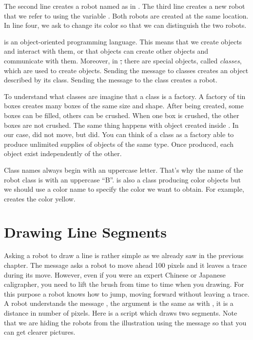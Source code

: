 The second line creates a robot named \caro as in . The third line creates a new robot that we refer to using the variable . Both robots are created at the same location. In line four, we ask \caro to change its color so that we can distinguish the two robots.



 \st {} is an object-oriented programming language. This means that we create objects and interact with them, or that objects can create other objects and communicate with them.  Moreover, in \st, there are special objects, called  \emph{classes}, which are used to create objects. Sending the message  to classes creates an object described by its class. Sending the message  to the  class creates a robot.

To understand what  classes are imagine that a class is a factory. A factory of tin boxes creates many boxes of the same size and shape. After being created, some boxes can be filled, others can be crushed. When one box is crushed, the other boxes are not crushed. The same thing happens with object created inside \sq. In our case, \caro did not move, but  did. You can think of a class as a factory able to produce unlimited supplies of objects of the same type. Once produced, each object exist
independently of the other. 

Class names always begin with an uppercase letter. That's why the
name of the robot class is  with an uppercase ``B''.
 is also a class producing color objects but we should use a color name
to specify the color we want to obtain. For example,  creates the color yellow.





\section{Drawing Line Segments}

Asking a robot to draw a line is rather simple as we already saw in the previous chapter. The message  asks a robot to move ahead 100 pixels and it leaves a trace during its move. However, even if you were an expert Chinese or Japanese caligrapher, you need to lift the brush from time to time when you drawing. For this purpose a robot knows how to jump, \ie moving forward without leaving a trace. A robot understands the message , the argument is the same as with \go, it is a distance in number of pixels. Here is a script which draws two segments. Note that we are hiding the robots from the illustration using the message  so that you can get clearer pictures.

